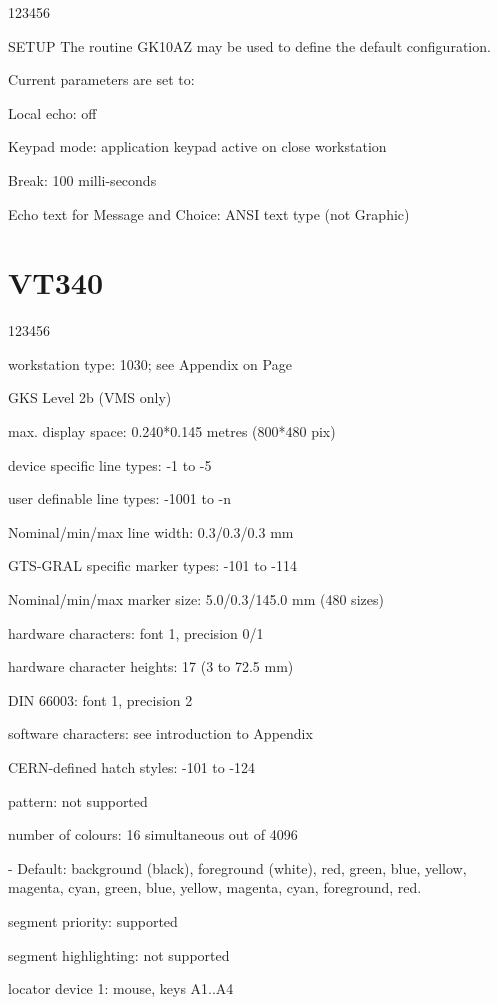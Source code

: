 \begin{DLtt}{123456}
\item[SETUP]The routine GK10AZ may be used to define the default
configuration.
\item[Current parameters are set to:]
\item[Local echo:]off
\item[Keypad mode:]application keypad active on close workstation
\item[Break:]100 milli-seconds
\item[Echo text for Message and Choice:]ANSI text type (not Graphic)
\end{DLtt}
\section{VT340}
\begin{DLtt}{123456}
\item[workstation type:]1030; see Appendix on Page~\pageref{sec:gtstyp}
\item[GKS Level]2b (VMS only)
\item[max. display space:]0.240*0.145 metres (800*480 pix)
\item[device specific line types:]-1 to -5
\item[user definable line types:]-1001 to -n
\item[Nominal/min/max line width:]0.3/0.3/0.3 mm
\item[GTS-GRAL specific marker types:]-101 to -114
\item[Nominal/min/max marker size:]5.0/0.3/145.0 mm (480 sizes)
\item[hardware characters:]font 1, precision 0/1
\item[hardware character heights:]17 (3 to 72.5 mm)
\item[DIN 66003:]font 1, precision 2
\item[software characters:]see introduction to Appendix
\item[CERN-defined hatch styles:]-101 to -124
\item[pattern:]not supported
\item[number of colours:]16 simultaneous out of 4096
\item[-]Default: background (black), foreground (white), red, green, blue,
yellow, magenta, cyan, green, blue, yellow, magenta, cyan, foreground, red.
\item[segment priority:]supported
\item[segment highlighting:]not supported
\item[locator device 1:]mouse, keys A1..A4

\end{DLtt}
